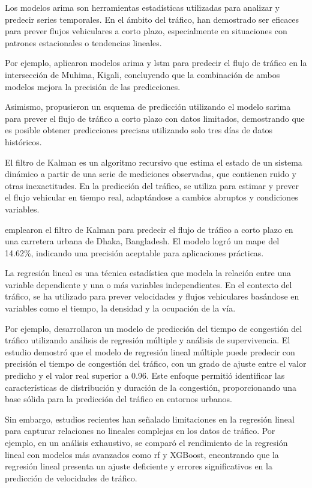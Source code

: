 Los modelos \acrlong{arima} son herramientas estadísticas utilizadas para analizar y predecir series temporales. En el ámbito del tráfico, han demostrado ser eficaces para prever flujos vehiculares a corto plazo, especialmente en situaciones con patrones estacionales o tendencias lineales.

Por ejemplo, \cite{forecastArimaLtsm} aplicaron modelos \acrshort{arima} y \acrshort{lstm} para predecir el flujo de tráfico en la intersección de Muhima, Kigali, concluyendo que la combinación de ambos modelos mejora la precisión de las predicciones.

Asimismo, \cite{forecastSarima} propusieron un esquema de predicción utilizando el modelo \acrlong{sarima} para prever el flujo de tráfico a corto plazo con datos limitados, demostrando que es posible obtener predicciones precisas utilizando solo tres días de datos históricos.

El filtro de Kalman es un algoritmo recursivo que estima el estado de un sistema dinámico a partir de una serie de mediciones observadas, que contienen ruido y otras inexactitudes. En la predicción del tráfico, se utiliza para estimar y prever el flujo vehicular en tiempo real, adaptándose a cambios abruptos y condiciones variables.​

\cite{forecastKalman} emplearon el filtro de Kalman para predecir el flujo de tráfico a corto plazo en una carretera urbana de Dhaka, Bangladesh. El modelo logró un \acrlong{mape} del 14.62\%, indicando una precisión aceptable para aplicaciones prácticas.

La regresión lineal es una técnica estadística que modela la relación entre una variable dependiente y una o más variables independientes. En el contexto del tráfico, se ha utilizado para prever velocidades y flujos vehiculares basándose en variables como el tiempo, la densidad y la ocupación de la vía.​

Por ejemplo, \cite{liu2020congestion} desarrollaron un modelo de predicción del tiempo de congestión del tráfico utilizando análisis de regresión múltiple y análisis de supervivencia. El estudio demostró que el modelo de regresión lineal múltiple puede predecir con precisión el tiempo de congestión del tráfico, con un grado de ajuste entre el valor predicho y el valor real superior a 0.96. Este enfoque permitió identificar las características de distribución y duración de la congestión, proporcionando una base sólida para la predicción del tráfico en entornos urbanos.​

Sin embargo, estudios recientes han señalado limitaciones en la regresión lineal para capturar relaciones no lineales complejas en los datos de tráfico. Por ejemplo, en un análisis exhaustivo, se comparó el rendimiento de la regresión lineal con modelos más avanzados como \acrlong{rf} y XGBoost, encontrando que la regresión lineal presenta un ajuste deficiente y errores significativos en la predicción de velocidades de tráfico.

